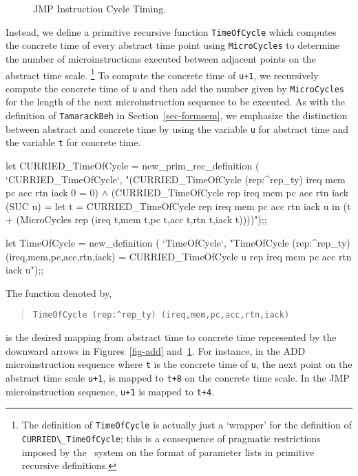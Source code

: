 \begin{figure}
\begin{center}


\caption{JMP Instruction Cycle Timing.}
\label{fig-jmp}
\end{center}
\end{figure}

Instead,
we define a primitive recursive function \verb"TimeOfCycle" which
computes the concrete time of every abstract time point
using \verb"MicroCycles" to determine the number of microinstructions
executed between adjacent points on the abstract time scale.
\footnote{
The definition of \verb"TimeOfCycle" is actually just
a `wrapper' for the definition of \verb"CURRIED\_TimeOfCycle";
this is a consequence of pragmatic restrictions imposed
by the \HOL\ system on the
format of parameter lists in primitive recursive definitions.}
To compute the concrete time of \verb"u+1",
we recursively compute the concrete time of \verb"u"
and then add the number given by \verb"MicroCycles" for
the length of the next microinstruction sequence
to be executed.
As with the definition of \verb"TamarackBeh" in
Section~\ref{sec-formsem},
we emphasize the distinction between abstract and concrete time
by using the variable \verb"u" for abstract time and the
variable \verb"t" for concrete time.

\begintt
let CURRIED_TimeOfCycle = new_prim_rec_definition (
  `CURRIED_TimeOfCycle`,
  "(CURRIED_TimeOfCycle (rep:^rep_ty) ireq mem pc acc rtn iack 0 = 0) \(\wedge\)
   (CURRIED_TimeOfCycle rep ireq mem pc acc rtn iack (SUC u) =
    let t = CURRIED_TimeOfCycle rep ireq mem pc acc rtn iack u in
    (t + (MicroCycles rep (ireq t,mem t,pc t,acc t,rtn t,iack t))))");;

let TimeOfCycle = new_definition (
  `TimeOfCycle`,
  "TimeOfCycle (rep:^rep_ty) (ireq,mem,pc,acc,rtn,iack) =
    CURRIED_TimeOfCycle u rep ireq mem pc acc rtn iack u");;
\endtt

The function denoted by,

\begin{quote}
\verb"TimeOfCycle (rep:^rep_ty) (ireq,mem,pc,acc,rtn,iack)"
\end{quote}

\noindent
is the desired mapping from abstract time to concrete time
represented by the downward arrows in Figures~\ref{fig-add}
and~\ref{fig-jmp}.
For instance, in the ADD microinstruction sequence where \verb"t" is
the concrete time of \verb"u",
the next point on the abstract time scale \verb"u+1",
is mapped to \verb"t+8" on the concrete time scale.
In the JMP microinstruction sequence, \verb"u+1"
is mapped to \verb"t+4".

